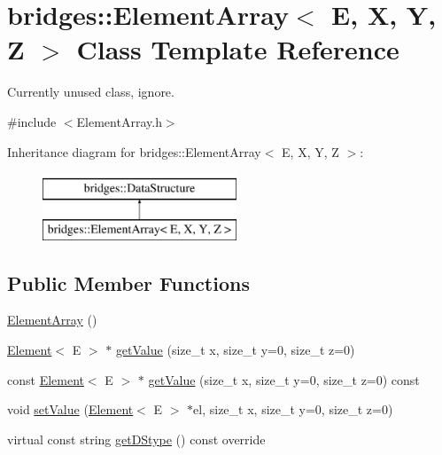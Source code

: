 \hypertarget{classbridges_1_1_element_array}{}\section{bridges\+:\+:Element\+Array$<$ E, X, Y, Z $>$ Class Template Reference}
\label{classbridges_1_1_element_array}


Currently unused class, ignore.  




{\ttfamily \#include $<$Element\+Array.\+h$>$}

Inheritance diagram for bridges\+:\+:Element\+Array$<$ E, X, Y, Z $>$\+:\begin{figure}[H]
\begin{center}
\leavevmode
\includegraphics[height=2.000000cm]{classbridges_1_1_element_array}
\end{center}
\end{figure}
\subsection*{Public Member Functions}
\begin{DoxyCompactItemize}
\item 
\hyperlink{classbridges_1_1_element_array_aef0cfb2b7b35cd5b368e4c3987e41768}{Element\+Array} ()
\item 
\hyperlink{classbridges_1_1_element}{Element}$<$ E $>$ $\ast$ \hyperlink{classbridges_1_1_element_array_a45bac55f6f64a90eb61fd3faaf1aaffe}{get\+Value} (size\+\_\+t x, size\+\_\+t y=0, size\+\_\+t z=0)
\item 
const \hyperlink{classbridges_1_1_element}{Element}$<$ E $>$ $\ast$ \hyperlink{classbridges_1_1_element_array_ab10a4e60f7d17e9112f87db672869a41}{get\+Value} (size\+\_\+t x, size\+\_\+t y=0, size\+\_\+t z=0) const 
\item 
void \hyperlink{classbridges_1_1_element_array_a202def849cd345d8b56ebcb31f332d25}{set\+Value} (\hyperlink{classbridges_1_1_element}{Element}$<$ E $>$ $\ast$el, size\+\_\+t x, size\+\_\+t y=0, size\+\_\+t z=0)
\item 
virtual const string \hyperlink{classbridges_1_1_element_array_a19e80a81e4d27f13e4a2091f371a7e18}{get\+D\+Stype} () const  override
\end{DoxyCompactItemize}


